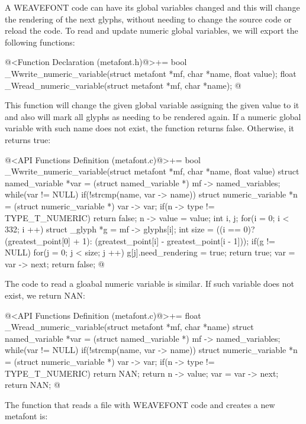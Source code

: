 {{{{{

A WEAVEFONT code can have its global variables changed and this will
change the rendering of the next glyphs, without needing to change the
source code or reload the code. To read and update numeric global
variables, we will export the following functions:

\iniciocodigo
@<Function Declaration (metafont.h)@>+=
bool _Wwrite_numeric_variable(struct metafont *mf, char *name, float value);
float _Wread_numeric_variable(struct metafont *mf, char *name);
@
\fimcodigo

This function will change the given global variable assigning the
given value to it and also will mark all glyphs as needing to be
rendered again. If a numeric global variable with such name does not
exist, the function returns false. Otherwise, it returns true:

\iniciocodigo
@<API Functions Definition (metafont.c)@>+=
bool _Wwrite_numeric_variable(struct metafont *mf, char *name, float value){
  struct named_variable *var = (struct named_variable *) mf -> named_variables;
  while(var != NULL){
    if(!strcmp(name, var -> name)){
      struct numeric_variable *n = (struct numeric_variable *) var -> var;
      if(n -> type != TYPE_T_NUMERIC)
        return false;
      n -> value = value;
      {
        int i, j;
        for(i = 0; i < 332; i ++){
          struct _glyph *g = mf -> glyphs[i];
          int size = ((i == 0)?(greatest_point[0] + 1):
                               (greatest_point[i] - greatest_point[i - 1]));
          if(g != NULL){
            for(j = 0; j < size; j ++)
                g[j].need_rendering = true;
          }
        }
      }
      return true;
    }
    var = var -> next;
  }
  return false;
}
@
\fimcodigo

The code to read a gloabal numeric variable is similar. If such
variable does not exist, we return NAN:

\iniciocodigo
@<API Functions Definition (metafont.c)@>+=
float _Wread_numeric_variable(struct metafont *mf, char *name){
  struct named_variable *var = (struct named_variable *) mf -> named_variables;
  while(var != NULL){
    if(!strcmp(name, var -> name)){
      struct numeric_variable *n = (struct numeric_variable *) var -> var;
      if(n -> type != TYPE_T_NUMERIC)
        return NAN;
      return n -> value;
    }
    var = var -> next;
  }
  return NAN;
}
@
\fimcodigo

The function that reads a file with WEAVEFONT code and creates a new
metafont is:

}}}}}
